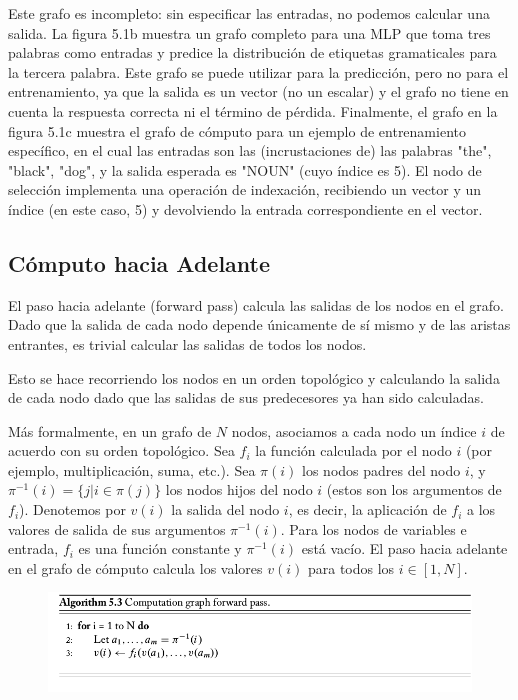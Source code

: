 Este grafo es incompleto: sin especificar las entradas, no podemos calcular una salida. La figura 5.1b muestra un grafo completo para una MLP que toma tres palabras como entradas y predice la distribución de etiquetas gramaticales para la tercera palabra. Este grafo se puede utilizar para la predicción, pero no para el entrenamiento, ya que la salida es un vector (no un escalar) y el grafo no tiene en cuenta la respuesta correcta ni el término de pérdida. Finalmente, el grafo en la figura 5.1c muestra el grafo de cómputo para un ejemplo de entrenamiento específico, en el cual las entradas son las (incrustaciones de) las palabras "the", "black", "dog", y la salida esperada es "NOUN" (cuyo índice es 5). El nodo de selección implementa una operación de indexación, recibiendo un vector y un índice (en este caso, 5) y devolviendo la entrada correspondiente en el vector.

\subsection{Cómputo hacia Adelante}
El paso hacia adelante (forward pass) calcula las salidas de los nodos en el grafo. Dado que la salida de cada nodo depende únicamente de sí mismo y de las aristas entrantes, es trivial calcular las salidas de todos los nodos.

Esto se hace recorriendo los nodos en un orden topológico y calculando la salida de cada nodo dado que las salidas de sus predecesores ya han sido calculadas.

Más formalmente, en un grafo de $N$ nodos, asociamos a cada nodo un índice $i$ de acuerdo con su orden topológico. Sea $f_i$ la función calculada por el nodo $i$ (por ejemplo, multiplicación, suma, etc.). Sea $\pi(i)$ los nodos padres del nodo $i$, y $\pi^{-1}(i) = \{j | i \in \pi(j)\}$ los nodos hijos del nodo $i$ (estos son los argumentos de $f_i$). Denotemos por $v(i)$ la salida del nodo $i$, es decir, la aplicación de $f_i$ a los valores de salida de sus argumentos $\pi^{-1}(i)$. Para los nodos de variables e entrada, $f_i$ es una función constante y $\pi^{-1}(i)$ está vacío. El paso hacia adelante en el grafo de cómputo calcula los valores $v(i)$ para todos los $i \in [1,N]$.

\begin{figure}[htb]
	\centering
	 \includegraphics[scale=0.35]{pics/forwardPass.png}
\end{figure}

